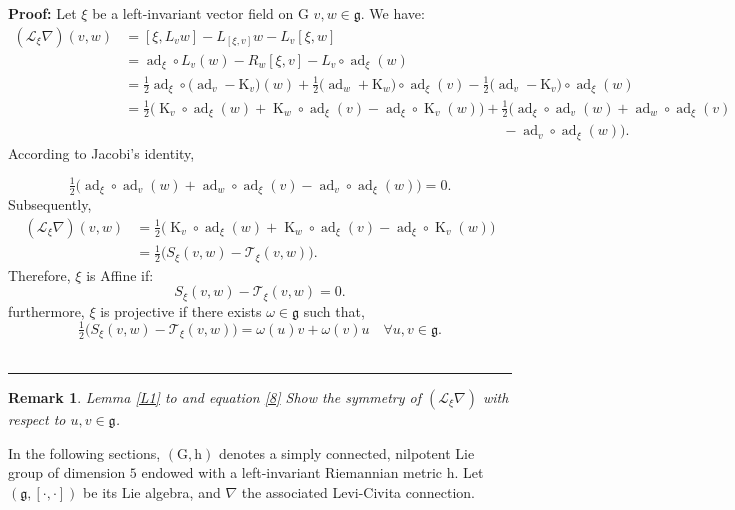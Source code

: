 \documentclass[10pt]{article}
\newtheorem{Remark}{Remark}
\newenvironment{proof}[1][Proof]{\textbf{#1:} }{\ \rule{0.5em}{0.5em}}
\begin{document}
\begin{proof}
Let $\xi$ be a left-invariant vector field on $\mathrm{G}$ $v, w\in \mathfrak{g}$. We have:
\begin{align} 
(\mathscr{L}_\xi \nabla)(v, w)
&= [\xi,L_v w]-L_{[\xi,v]}w-L_v[\xi,w]\nonumber\\
&= \operatorname{ad}_\xi\circ L_v(w)-R_w{[\xi,v]}-L_v\circ \operatorname{ad}_\xi(w)\nonumber\\
&=\tfrac{1}{2}\operatorname{ad}_\xi\circ \big(\operatorname{ad}_v - \mathrm{K}_v \big)(w)+\tfrac{1}{2}\big( \operatorname{ad}_w+ \mathrm{K}_w\big)\circ \operatorname{ad}_\xi(v)-\tfrac{1}{2}\big(\operatorname{ad}_v - \mathrm{K}_v)\circ \operatorname{ad}_\xi(w)\nonumber\\
&=\tfrac{1}{2} \big(\operatorname{K}_v\circ \operatorname{ad}_\xi (w)+ \operatorname{K}_w\circ \operatorname{ad}_\xi (v)-\operatorname{ad}_\xi\circ \operatorname{K}_v(w) \big)+\tfrac{1}{2} \big(\operatorname{ad}_\xi\circ \operatorname{ad}_v(w)+\operatorname{ad}_w\circ \operatorname{ad}_\xi(v)\nonumber\\
&\qquad\qquad\qquad\qquad\qquad\qquad\qquad\qquad\qquad\qquad\qquad\qquad\quad\qquad-\operatorname{ad}_v\circ \operatorname{ad}_\xi(w)\big).\label{7}
\end{align}
According to Jacobi's identity,

$$\tfrac{1}{2} \big(\operatorname{ad}_\xi\circ \operatorname{ad}_v(w)+\operatorname{ad}_w\circ \operatorname{ad}_\xi(v)-\operatorname{ad}_v\circ \operatorname{ad}_\xi(w)\big)=0.$$
Subsequently, \begin{align}
(\mathscr{L}_\xi \nabla)(v, w) &= \tfrac{1}{2} \big(\operatorname{K}_v\circ \operatorname{ad}_\xi (w)+ \operatorname{K}_w\circ \operatorname{ad}_\xi (v)-\operatorname{ad}_\xi\circ \operatorname{K}_v(w) \big)\nonumber\\
&=\tfrac12\big(S_\xi(v,w)-\mathscr{T}_\xi(v,w)\big).\label{8}
\end{align}
Therefore, $\xi$ is Affine if: \begin{equation*}
S_\xi(v,w)-\mathscr{T}_\xi(v,w)=0.
\end{equation*}
furthermore, $\xi$ is projective if there exists $\omega\in\mathfrak{g}$ such that, \begin{equation}
   \tfrac12\big(S_\xi(v,w)-\mathscr{T}_\xi(v,w)\big)=\omega(u)v+\omega(v)u\quad \forall u,v\in \mathfrak{g}. 
\end{equation}
\end{proof}
\begin{Remark}
    Lemma \ref{L1} to and equation \eqref{8} Show the symmetry of $(\mathscr{L}_\xi \nabla)$ with respect to $u,v\in \mathfrak{g}$.
\end{Remark}
In the following sections, $(\mathrm{G},\mathrm{h})$ denotes a simply connected, nilpotent Lie group of dimension $5$ endowed with a left-invariant Riemannian metric $\mathrm{h}$. Let $(\mathfrak{g},[\cdot,\cdot])$ be its Lie algebra, and $\nabla$ the associated Levi-Civita connection. 
\end{document}
